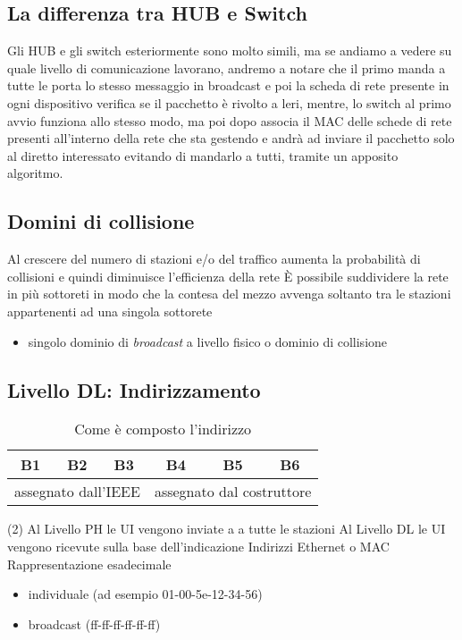 \documentclass{book}
\begin{document}
\subsection{La differenza tra HUB e Switch}
Gli HUB e gli switch esteriormente sono molto simili, ma se andiamo a vedere su
quale livello di comunicazione lavorano, andremo a notare che il primo manda a
tutte le porta lo stesso messaggio in broadcast e poi la scheda di rete
presente in ogni dispositivo verifica se il pacchetto è rivolto a leri, mentre,
lo switch al primo avvio funziona allo stesso modo, ma poi dopo associa il MAC
delle schede di rete presenti all'interno della rete che sta gestendo e andrà
ad inviare il pacchetto solo al diretto interessato evitando di mandarlo a
tutti, tramite un apposito algoritmo.

\subsection{Domini di collisione}
\begin{tasks}
	\task Al crescere del numero di stazioni e/o del traffico aumenta la
	probabilità di collisioni e quindi diminuisce l'efficienza della rete
	\task È possibile suddividere la rete in più sottoreti in modo che la
	contesa del mezzo avvenga soltanto tra le stazioni appartenenti ad una
	singola sottorete
	\begin{itemize}
		\item singolo dominio di \textit{broadcast} a livello fisico o dominio
			di collisione
	\end{itemize}
\end{tasks}

\subsection{Livello DL: Indirizzamento}
\begin{table}[h!]
	\centering
	\begin{tabular}{|c||c||c||c||c||c|}
		\hline
		B1&B2&B3&B4&B5&B6\\\hline
		\multicolumn{3}{c}{assegnato dall'IEEE}&\multicolumn{3}{c}{assegnato
		dal costruttore}
	\end{tabular}
	\caption{Come è composto l'indirizzo}
\end{table}
\begin{tasks}(2)
	\task Al Livello PH le UI vengono inviate a a tutte le stazioni
	\task Al Livello DL le UI vengono ricevute sulla base dell'indicazione
	\task Indirizzi Ethernet o MAC
	\task Rappresentazione esadecimale
	\begin{itemize}
		\item individuale (ad esempio 01-00-5e-12-34-56)
		\item broadcast (ff-ff-ff-ff-ff-ff)
	\end{itemize}
\end{tasks}
\end{document}
